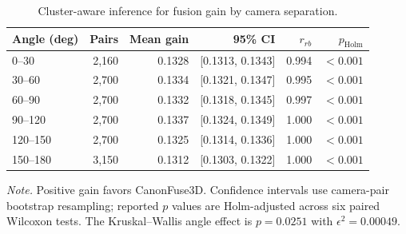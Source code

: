 \begin{table}[t]
\centering
\caption{Cluster-aware inference for fusion gain by camera separation.}
\label{tab:view_angle_significance}
\footnotesize
\begin{tabular}{lrrrrr}
\toprule
Angle (deg) & Pairs & Mean gain & 95\% CI & $r_{rb}$ & $p_{\mathrm{Holm}}$ \\
\midrule
0--30 & 2,160 & 0.1328 & [0.1313, 0.1343] & 0.994 & \(<0.001\) \\
30--60 & 2,700 & 0.1334 & [0.1321, 0.1347] & 0.995 & \(<0.001\) \\
60--90 & 2,700 & 0.1332 & [0.1318, 0.1345] & 0.997 & \(<0.001\) \\
90--120 & 2,700 & 0.1337 & [0.1324, 0.1349] & 1.000 & \(<0.001\) \\
120--150 & 2,700 & 0.1325 & [0.1314, 0.1336] & 1.000 & \(<0.001\) \\
150--180 & 3,150 & 0.1312 & [0.1303, 0.1322] & 1.000 & \(<0.001\) \\
\bottomrule
\end{tabular}
\vspace{0.3em}
\parbox{0.96\textwidth}{\footnotesize \textit{Note.} Positive gain favors CanonFuse3D. Confidence intervals use camera-pair bootstrap resampling; reported $p$ values are Holm-adjusted across six paired Wilcoxon tests. The Kruskal--Wallis angle effect is $p=0.0251$ with $\epsilon^2=0.00049$.}
\end{table}
